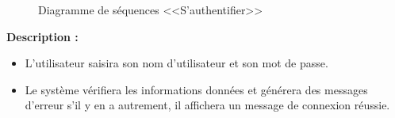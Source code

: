 \documentclass[12pt]{report}
\begin{document}
\newpage

\begin{figure}[h]
\centering
    \centerline{}
    \caption{Diagramme de séquences <<S'authentifier>>}
\end{figure}

\vspace{0.3in}

\textbf{Description :}

\begin{itemize}
    \item L'utilisateur saisira son nom d'utilisateur et son mot de passe.
    \item Le système vérifiera les informations données et générera des messages d'erreur s'il y en a autrement, il affichera un message de connexion réussie.
\end{itemize}

\newpage
\end{document}
